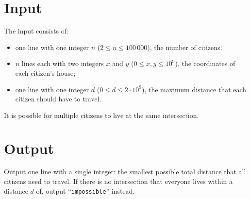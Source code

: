 \section*{Input}

The input consists of:
\begin{itemize}
  \item one line with one integer $n$ ($2 \leq n \leq 100\,000$), the number of citizens;
  \item $n$ lines each with two integers $x$ and $y$ ($0 \leq x,y \leq 10^9$), the coordinates of each citizen's house;
  \item one line with one integer $d$ ($0 \leq d \leq 2 \cdot 10^9$), the maximum distance that each citizen should have to travel.
\end{itemize}
It is possible for multiple citizens to live at the same intersection.

\section*{Output}
Output one line with a single integer: the smallest possible total distance that all citizens need to travel. If there is no intersection that everyone lives within a distance $d$ of, output ``\texttt{impossible}'' instead.
